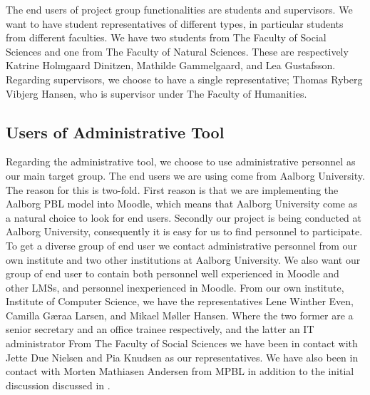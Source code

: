 The end users of project group functionalities are students and supervisors.
We want to have student representatives of different types, in particular students from different faculties.
We have two students from The Faculty of Social Sciences and one from The Faculty of Natural Sciences.
These are respectively Katrine Holmgaard Dinitzen, Mathilde Gammelgaard, and Lea Gustafsson.
Regarding supervisors, we choose to have a single representative; Thomas Ryberg Vibjerg Hansen, who is supervisor under The Faculty of Humanities.

\subsection{Users of Administrative Tool}
\label{sub:enduserstool}
Regarding the administrative tool, we choose to use administrative personnel as our main target group.
The end users we are using come from Aalborg University.
The reason for this is two-fold.
First reason is that we are implementing the Aalborg PBL model into Moodle, which means that Aalborg University come as a natural choice to look for end users.
Secondly our project is being conducted at Aalborg University, consequently it is easy for us to find personnel to participate.
To get a diverse group of end user we contact administrative personnel from our own institute and two other institutions at Aalborg University.
We also want our group of end user to contain both personnel well experienced in Moodle and other LMSs, and personnel inexperienced in Moodle.
From our own institute, Institute of Computer Science, we have the representatives Lene Winther Even, Camilla G\ae{}raa Larsen, and Mikael M\o{}ller Hansen.
Where the two former are a senior secretary and an office trainee respectively, and the latter an IT administrator
From The Faculty of Social Sciences we have been in contact with  Jette Due Nielsen and Pia Knudsen as our representatives.
We have also been in contact with Morten Mathiasen Andersen from MPBL in addition to the initial discussion discussed in .

